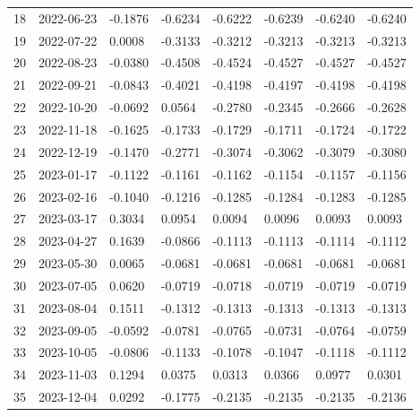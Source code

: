 {\begin{longtable}{llllllll}
18 & 2022-06-23 & -0.1876 & -0.6234 & -0.6222 & -0.6239 & -0.6240 & -0.6240 \\
19 & 2022-07-22 & 0.0008 & -0.3133 & -0.3212 & -0.3213 & -0.3213 & -0.3213 \\
20 & 2022-08-23 & -0.0380 & -0.4508 & -0.4524 & -0.4527 & -0.4527 & -0.4527 \\
21 & 2022-09-21 & -0.0843 & -0.4021 & -0.4198 & -0.4197 & -0.4198 & -0.4198 \\
22 & 2022-10-20 & -0.0692 & 0.0564 & -0.2780 & -0.2345 & -0.2666 & -0.2628 \\
23 & 2022-11-18 & -0.1625 & -0.1733 & -0.1729 & -0.1711 & -0.1724 & -0.1722 \\
24 & 2022-12-19 & -0.1470 & -0.2771 & -0.3074 & -0.3062 & -0.3079 & -0.3080 \\
25 & 2023-01-17 & -0.1122 & -0.1161 & -0.1162 & -0.1154 & -0.1157 & -0.1156 \\
26 & 2023-02-16 & -0.1040 & -0.1216 & -0.1285 & -0.1284 & -0.1283 & -0.1285 \\
27 & 2023-03-17 & 0.3034 & 0.0954 & 0.0094 & 0.0096 & 0.0093 & 0.0093 \\
28 & 2023-04-27 & 0.1639 & -0.0866 & -0.1113 & -0.1113 & -0.1114 & -0.1112 \\
29 & 2023-05-30 & 0.0065 & -0.0681 & -0.0681 & -0.0681 & -0.0681 & -0.0681 \\
30 & 2023-07-05 & 0.0620 & -0.0719 & -0.0718 & -0.0719 & -0.0719 & -0.0719 \\
31 & 2023-08-04 & 0.1511 & -0.1312 & -0.1313 & -0.1313 & -0.1313 & -0.1313 \\
32 & 2023-09-05 & -0.0592 & -0.0781 & -0.0765 & -0.0731 & -0.0764 & -0.0759 \\
33 & 2023-10-05 & -0.0806 & -0.1133 & -0.1078 & -0.1047 & -0.1118 & -0.1112 \\
34 & 2023-11-03 & 0.1294 & 0.0375 & 0.0313 & 0.0366 & 0.0977 & 0.0301 \\
35 & 2023-12-04 & 0.0292 & -0.1775 & -0.2135 & -0.2135 & -0.2135 & -0.2136 \\
\end{longtable}
}
